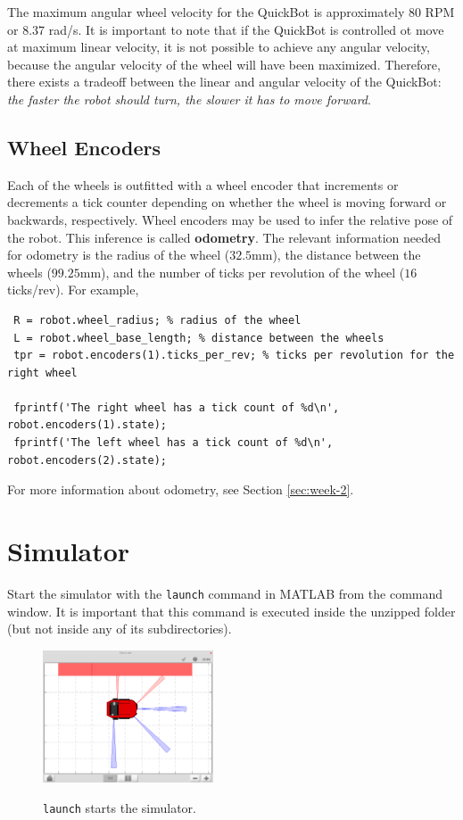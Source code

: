 \documentclass[10pt]{article}
\begin{document}
The maximum angular wheel velocity for the QuickBot is approximately 80 RPM or 8.37 rad/s. It is important to note that if the QuickBot is controlled ot move at maximum linear velocity, it is not possible to achieve any angular velocity, because the angular velocity of the wheel will have been maximized. Therefore, there exists a tradeoff between the linear and angular velocity of the QuickBot: \textit{the faster the robot should turn, the slower it has to move forward}.

\subsection{Wheel Encoders}

Each of the wheels is outfitted with a wheel encoder that increments or decrements a tick counter depending on whether the wheel is moving forward or backwards, respectively. Wheel encoders may be used to infer the relative pose of the robot. This inference is called \textbf{odometry}. The relevant information needed for odometry is the radius of the wheel ($32.5$mm), the distance between the wheels ($99.25$mm), and the number of ticks per revolution of the wheel ($16$ ticks/rev). For example,

\begin{verbatim}
 R = robot.wheel_radius; % radius of the wheel
 L = robot.wheel_base_length; % distance between the wheels
 tpr = robot.encoders(1).ticks_per_rev; % ticks per revolution for the right wheel

 fprintf('The right wheel has a tick count of %d\n', robot.encoders(1).state);
 fprintf('The left wheel has a tick count of %d\n', robot.encoders(2).state);
\end{verbatim}

For more information about odometry, see Section \ref{sec:week-2}.

\newpage
\section{Simulator}

Start the simulator with the \texttt{launch} command in MATLAB from the command window. It is important that this command is executed inside the unzipped folder (but not inside any of its subdirectories).

\begin{figure}[h]
  \centering
  \includegraphics[width=0.45\textwidth]{images/simiam-quickbot.png}
  \label{fig:simulator}
  \caption{\texttt{launch} starts the simulator.}
\end{figure}
\end{document}
